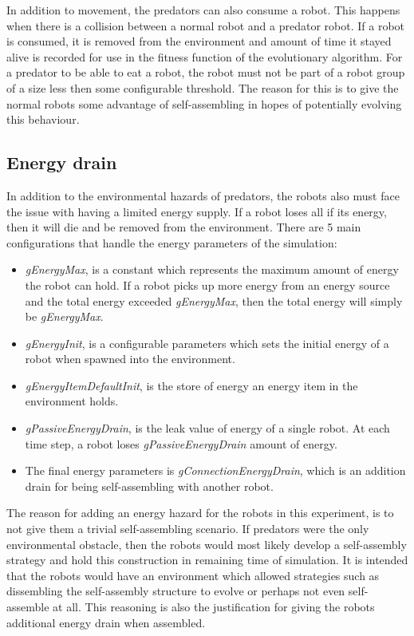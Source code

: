 In addition to movement, the predators can also consume a robot. 
This happens when there is a collision between a normal robot and a predator robot.
If a robot is consumed, it is removed from the environment and amount of time it stayed alive is recorded for use in the fitness function of the evolutionary algorithm. 
For a predator to be able to eat a robot, the robot must not be part of a robot group of a size less then some configurable threshold.
The reason for this is to give the normal robots some advantage of self-assembling in hopes of potentially evolving this behaviour.  

\subsection{Energy drain}
In addition to the environmental hazards of predators, the robots also must face the issue with having a limited energy supply.
If a robot loses all if its energy, then it will die and be removed from the environment.
There are 5 main configurations that handle the energy parameters of the simulation:

\begin{itemize}

\item \emph{gEnergyMax}, is a constant which represents the maximum amount of energy the robot can hold.
If a robot picks up more energy from an energy source and the total energy exceeded \emph{gEnergyMax}, then the total energy will simply be \emph{gEnergyMax}.

\item \emph{gEnergyInit}, is a configurable parameters which sets the initial energy of a robot when spawned into the environment.

\item \emph{gEnergyItemDefaultInit}, is the store of energy an energy item in the environment holds.

\item \emph{gPassiveEnergyDrain}, is the leak value of energy of a single robot. At each time step, a robot loses \emph{gPassiveEnergyDrain} amount of energy.

\item The final energy parameters is \emph{gConnectionEnergyDrain}, which is an addition drain for being self-assembling with another robot.


\end{itemize}


The reason for adding an energy hazard for the robots in this experiment, is to not give them a trivial self-assembling scenario.
If predators were the only environmental obstacle, then the robots would most likely develop a self-assembly strategy and hold this construction in remaining time of simulation.
It is intended that the robots would have an environment which allowed strategies such as dissembling the self-assembly structure to evolve or perhaps not even self-assemble at all.
This reasoning is also the justification for giving the robots additional energy drain when assembled.

